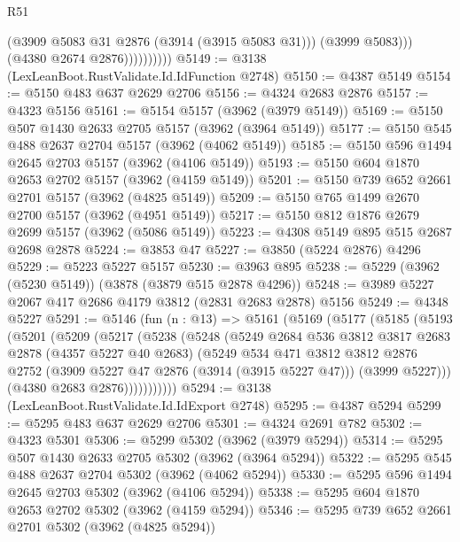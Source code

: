\begin{lexlean}{R51}
\begin{coremodule}
                          (@3909 @5083 @31 @2876 (@3914 (@3915 @5083 @31)))
                          (@3999 @5083)))
                      (@4380 @2674 @2876))))))))))
@5149 := @3138 (LexLeanBoot.RustValidate.Id.IdFunction @2748)
@5150 := @4387 @5149
@5154 := @5150 @483 @637 @2629 @2706
@5156 := @4324 @2683 @2876
@5157 := @4323 @5156
@5161 := @5154 @5157 (@3962 (@3979 @5149))
@5169 := @5150 @507 @1430 @2633 @2705 @5157 (@3962 (@3964 @5149))
@5177 := @5150 @545 @488 @2637 @2704 @5157 (@3962 (@4062 @5149))
@5185 := @5150 @596 @1494 @2645 @2703 @5157 (@3962 (@4106 @5149))
@5193 := @5150 @604 @1870 @2653 @2702 @5157 (@3962 (@4159 @5149))
@5201 := @5150 @739 @652 @2661 @2701 @5157 (@3962 (@4825 @5149))
@5209 := @5150 @765 @1499 @2670 @2700 @5157 (@3962 (@4951 @5149))
@5217 := @5150 @812 @1876 @2679 @2699 @5157 (@3962 (@5086 @5149))
@5223 := @4308 @5149 @895 @515 @2687 @2698 @2878
@5224 := @3853 @47
@5227 := @3850 (@5224 @2876) @4296
@5229 := @5223 @5227 @5157
@5230 := @3963 @895
@5238 := @5229 (@3962 (@5230 @5149)) (@3878 (@3879 @515 @2878 @4296))
@5248 := @3989 @5227 @2067 @417 @2686 @4179 @3812 (@2831 @2683 @2878) @5156
@5249 := @4348 @5227
@5291 := @5146
    (fun (n : @13) =>
    @5161
      (@5169
        (@5177
          (@5185
            (@5193
              (@5201
                (@5209
                  (@5217
                    (@5238
                      (@5248
                        (@5249
                          @2684
                          @536
                          @3812
                          @3817
                          @2683
                          @2878
                          (@4357 @5227 @40 @2683)
                          (@5249
                            @534
                            @471
                            @3812
                            @3812
                            @2876
                            @2752
                            (@3909 @5227 @47 @2876 (@3914 (@3915 @5227 @47)))
                            (@3999 @5227)))
                        (@4380 @2683 @2876)))))))))))
@5294 := @3138 (LexLeanBoot.RustValidate.Id.IdExport @2748)
@5295 := @4387 @5294
@5299 := @5295 @483 @637 @2629 @2706
@5301 := @4324 @2691 @782
@5302 := @4323 @5301
@5306 := @5299 @5302 (@3962 (@3979 @5294))
@5314 := @5295 @507 @1430 @2633 @2705 @5302 (@3962 (@3964 @5294))
@5322 := @5295 @545 @488 @2637 @2704 @5302 (@3962 (@4062 @5294))
@5330 := @5295 @596 @1494 @2645 @2703 @5302 (@3962 (@4106 @5294))
@5338 := @5295 @604 @1870 @2653 @2702 @5302 (@3962 (@4159 @5294))
@5346 := @5295 @739 @652 @2661 @2701 @5302 (@3962 (@4825 @5294))

\end{coremodule}
\end{lexlean}
